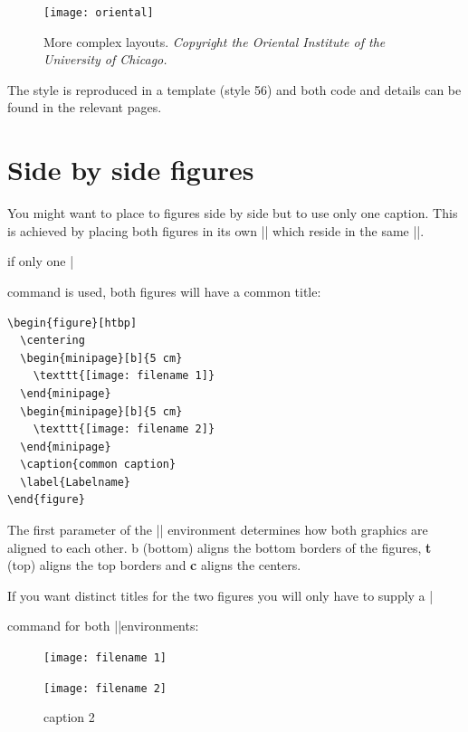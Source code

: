\begin{dispListing}
\begin{figure}[p]
\centering
\texttt{[image: oriental]}
\caption{More complex layouts. \emph{Copyright the Oriental Institute of the University of Chicago.}}
\label{complex}
\end{figure}

The style is reproduced in a  template (style 56) and both code and details can be found in the relevant pages.





\section{Side by side figures}

You might want to place to figures side by side but to use only one caption. This is achieved by placing both figures in its own |\minipage| which reside in the same |\figure|.

if only one |\caption| command is used, both figures will have a common title:

\medskip
\begin{verbatim}
\begin{figure}[htbp]
  \centering
  \begin{minipage}[b]{5 cm}
    \texttt{[image: filename 1]}  
  \end{minipage}
  \begin{minipage}[b]{5 cm}
    \texttt{[image: filename 2]}  
  \end{minipage}
  \caption{common caption}
  \label{Labelname}
\end{figure}
\end{verbatim}
\medskip

The first parameter of the |\minipage| environment determines how both graphics are aligned to each other. b (bottom) aligns the bottom borders of the figures, \textbf{t} (top) aligns the top borders and \textbf{c} aligns the centers.

If you want distinct titles for the two figures you will only have to supply a |\caption| command for both |\minipage|environments:

\begin{teX}
\begin{figure}[htbp]
  \centering
  \begin{minipage}[b]{5 cm}
    \texttt{[image: filename 1]} 
    \caption{caption 1}
    \label{labelname 1}
  \end{minipage}
  \begin{minipage}[b]{5 cm}
    \texttt{[image: filename 2]}  
    \caption{caption 2}
    \label{labelname 2}
  \end{minipage}
\end{figure}
\end{teX}



\end{dispListing}
